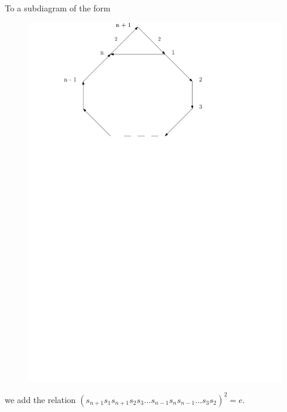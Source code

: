 \documentclass{beamer}
\begin{document}
\begin{frame}
To a subdiagram of the form
\begin{figure}
\includegraphics[scale = .50]{Diagram4.pdf}
\end{figure}
we add the relation $(s_{n+1}s_{1}s_{n+1}s_{2}s_{3} \dots s_{n-1}s_{n}s_{n-1} \dots s_{3}s_{2})^{2} = e$.
\end{frame}
\end{document}
